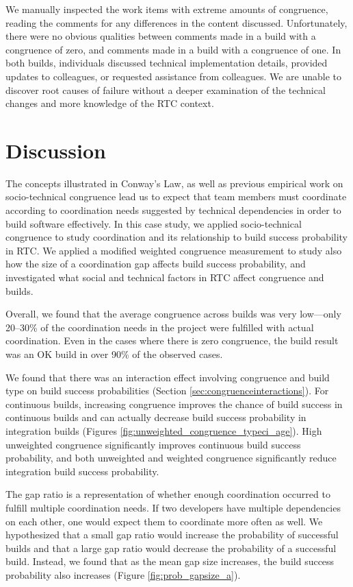 We manually inspected the work items with extreme amounts of congruence, reading the comments for any differences in the content discussed. Unfortunately, there were no obvious qualities between comments made in a build with a congruence of zero, and comments made in a build with a congruence of one. In both builds, individuals discussed technical implementation details, provided updates to colleagues, or requested assistance from colleagues. We are unable to discover root causes of failure without a deeper examination of the technical changes and more knowledge of the RTC context.


\section{Discussion}
\label{sec:discussion}
The concepts illustrated in Conway's Law, as well as previous empirical work on socio-technical congruence lead us to expect that team members must coordinate according to coordination needs suggested by technical dependencies in order to build software effectively.
In this case study, we applied socio-technical congruence to study coordination and its relationship to build success probability in RTC. We applied a modified weighted congruence measurement to study also how the size of a coordination gap affects build success probability, and investigated what social and technical factors in RTC affect congruence and builds.

Overall, we found that the average congruence across builds was very low---only 20--30\% of the coordination needs in the project were fulfilled with actual coordination. Even in the cases where there is zero congruence, the build result was an OK build in over 90\% of the observed cases.

We found that there was an interaction effect involving congruence and build type on build success probabilities (Section \ref{sec:congruenceinteractions}). For continuous builds, increasing congruence improves the chance of build success in continuous builds and can actually decrease build success probability in integration builds (Figures \ref{fig:unweighted_congruence_typeci_age}). High unweighted congruence significantly improves continuous build success probability, and both unweighted and weighted congruence significantly reduce integration build success probability.

The gap ratio is a representation of whether enough coordination
occurred to fulfill multiple coordination needs. If two developers have multiple dependencies on each other, one would expect them to
coordinate more often as well.
We hypothesized that a small gap ratio would increase the probability of successful builds and that a large gap ratio would decrease the probability of a successful build. Instead, we found that as the mean gap size increases, the build success probability also increases (Figure \ref{fig:prob_gapsize_a}).

